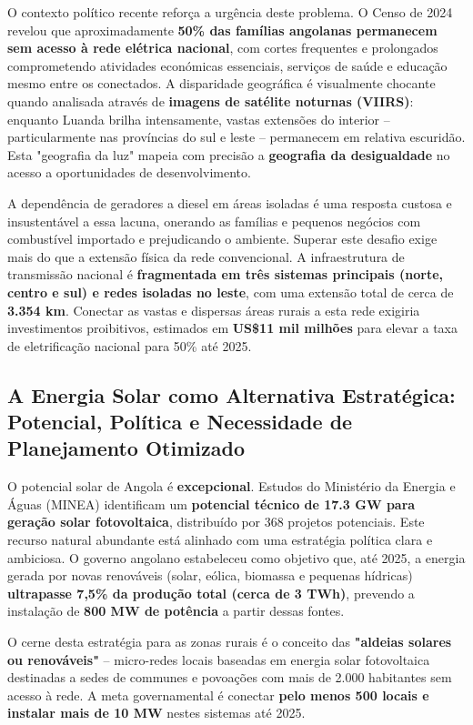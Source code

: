 \documentclass[12pt, a4paper]{article}
\begin{document}
O contexto político recente reforça a urgência deste problema. O Censo de 2024 revelou que aproximadamente \textbf{50\% das famílias angolanas permanecem sem acesso à rede elétrica nacional}, com cortes frequentes e prolongados comprometendo atividades económicas essenciais, serviços de saúde e educação mesmo entre os conectados. A disparidade geográfica é visualmente chocante quando analisada através de \textbf{imagens de satélite noturnas (VIIRS)}: enquanto Luanda brilha intensamente, vastas extensões do interior – particularmente nas províncias do sul e leste – permanecem em relativa escuridão. Esta "geografia da luz" mapeia com precisão a \textbf{geografia da desigualdade} no acesso a oportunidades de desenvolvimento.

A dependência de geradores a diesel em áreas isoladas é uma resposta custosa e insustentável a essa lacuna, onerando as famílias e pequenos negócios com combustível importado e prejudicando o ambiente. Superar este desafio exige mais do que a extensão física da rede convencional. A infraestrutura de transmissão nacional é \textbf{fragmentada em três sistemas principais (norte, centro e sul) e redes isoladas no leste}, com uma extensão total de cerca de \textbf{3.354 km}. Conectar as vastas e dispersas áreas rurais a esta rede exigiria investimentos proibitivos, estimados em \textbf{US\$11 mil milhões} para elevar a taxa de eletrificação nacional para 50\% até 2025.

\subsection{A Energia Solar como Alternativa Estratégica: Potencial, Política e Necessidade de Planejamento Otimizado}

O potencial solar de Angola é \textbf{excepcional}. Estudos do Ministério da Energia e Águas (MINEA) identificam um \textbf{potencial técnico de 17.3 GW para geração solar fotovoltaica}, distribuído por 368 projetos potenciais. Este recurso natural abundante está alinhado com uma estratégia política clara e ambiciosa. O governo angolano estabeleceu como objetivo que, até 2025, a energia gerada por novas renováveis (solar, eólica, biomassa e pequenas hídricas) \textbf{ultrapasse 7,5\% da produção total (cerca de 3 TWh)}, prevendo a instalação de \textbf{800 MW de potência} a partir dessas fontes.

O cerne desta estratégia para as zonas rurais é o conceito das \textbf{"aldeias solares ou renováveis"} – micro-redes locais baseadas em energia solar fotovoltaica destinadas a sedes de communes e povoações com mais de 2.000 habitantes sem acesso à rede. A meta governamental é conectar \textbf{pelo menos 500 locais e instalar mais de 10 MW} nestes sistemas até 2025. 
\end{document}
